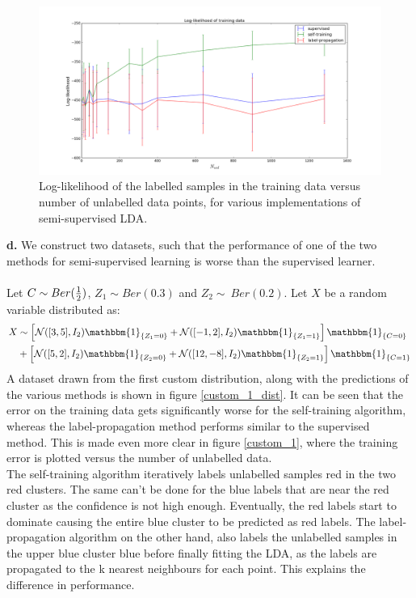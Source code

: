 \documentclass [a4paper] {report}
\begin{document}
	\begin{figure}[H]
		\begin{center}
			\includegraphics[scale=0.3]{Images/spambase_likelihood.png}
			\caption{Log-likelihood of the labelled samples in the training data versus number of unlabelled data points, for various implementations of semi-supervised LDA.}
			\label{spambase_likelihood}
		\end{center}
	\end{figure}
	
	\textbf{d.}
	We construct two datasets, such that the performance of one of the two methods for semi-supervised learning is worse than the supervised learner.\\\\
	Let $C \sim Ber({1 \over 2})$, $Z_{1} \sim Ber(0.3)$ and $Z_{2} \sim~ Ber(0.2)$. Let $X$ be a random variable distributed as:
	\begin{align*}
		X &\sim \left[ \mathcal{N}([3,5],I_{2})\mathbbm{1}_{\{Z_{1}=0\}} + \mathcal{N}([-1,2],I_{2})\mathbbm{1}_{\{Z_{1}=1\}}\right]\mathbbm{1}_{\{ C=0 \}}\\
		&+ \left[ \mathcal{N}([5,2],I_{2})\mathbbm{1}_{\{Z_{2}=0\}} + \mathcal{N}([12,-8],I_{2})\mathbbm{1}_{\{Z_{2}=1\}}\right]\mathbbm{1}_{\{ C=1 \}}
	\end{align*}
	A dataset drawn from the first custom distribution, along with the predictions of the various methods is shown in figure \ref{custom_1_dist}. It can be seen that the error on the training data gets significantly worse for the self-training algorithm, whereas the label-propagation method performs similar to the supervised method. This is made even more clear in figure \ref{custom_1}, where the training error is plotted versus the number of unlabelled data. \\
	\indent The self-training algorithm iteratively labels unlabelled samples red in the two red clusters. The same can't be done for the blue labels that are near the red cluster as the confidence is not high enough. Eventually, the red labels start to dominate causing the entire blue cluster to be predicted as red labels. The label-propagation algorithm on the other hand, also labels the unlabelled samples in the upper blue cluster blue before finally fitting the LDA, as the labels are propagated to the k nearest neighbours for each point. This explains the difference in performance.
	
\end{document}
